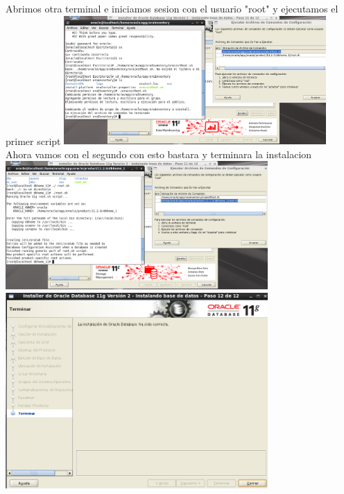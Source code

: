 \documentclass[12pt,letterpaper]{article}
\begin{document}
\begin{center}
Abrimos otra terminal e iniciamos sesion con el usuario "root" y ejecutamos el primer script
\includegraphics[width=10cm]{./oraclelinux/27.png}\\
Ahora vamos con el segundo  con esto bastara y terminara la instalacion\\
\includegraphics[width=10cm]{./oraclelinux/28.png}\\

\includegraphics[width=10cm]{./oraclelinux/29.png}\\
\end{center}
\end{document}

